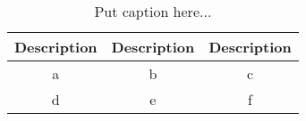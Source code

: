 \begin{table}[htbp]
\centering
\small
	\begin{tabular}{|c|c|c|}
		\hline
		\textbf{Description} & \textbf{Description} & \textbf{Description} \\
		\hline
		a & b & c\\
                \hline
		d & e & f \\
		\hline
	\end{tabular}
\caption{Put caption here...}
\label{tab:extable}
\end{table}
